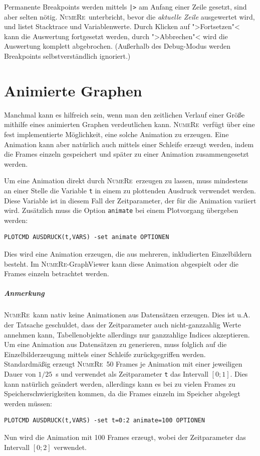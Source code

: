 \documentclass[DIV=14,headsepline,footsepline]{scrbook}
\newcommand{\NR}{\textsc{Nu\-me\-Re}}
\begin{document}
				Permanente Breakpoints werden mittels \verb+|>+ am Anfang einer Zeile gesetzt, sind aber selten nötig. \NR\ unterbricht, bevor die \emph{aktuelle Zeile} ausgewertet wird, und listet Stacktrace und Variablenwerte. Durch Klicken auf ">Fortsetzen"< kann die Auswertung fortgesetzt werden, durch ">Abbrechen"< wird die Auswertung komplett abgebrochen. (Außerhalb des Debug-Modus werden Breakpoints selbstverständlich ignoriert.)
				
		\chapter{Animierte Graphen}
			Manchmal kann es hilfreich sein, wenn man den zeitlichen Verlauf einer Größe mithilfe eines animierten Graphen verdeutlichen kann. \NR\ verfügt über eine fest implementierte Möglichkeit, eine solche Animation zu erzeugen. Eine Animation kann aber natürlich auch mittels einer Schleife erzeugt werden, indem die Frames einzeln gespeichert und später zu einer Animation zusammengesetzt werden.
			
			Um eine Animation direkt durch \NR\ erzeugen zu lassen, muss mindestens an einer Stelle die Variable \verb+t+ in einem zu plottenden Ausdruck verwendet werden. Diese Variable ist in diesem Fall der Zeitparameter, der für die Animation variiert wird. Zusätzlich muss die Option \verb+animate+ bei einem Plotvorgang übergeben werden:
			\begin{lstlisting}
PLOTCMD AUSDRUCK(t,VARS) -set animate OPTIONEN
			\end{lstlisting}
			Dies wird eine Animation erzeugen, die aus mehreren, inkludierten Einzelbildern besteht. Im \NR-GraphViewer kann diese Animation abgespielt oder die Frames einzeln betrachtet werden.
			
			\paragraph{Anmerkung}
				\NR\ kann nativ keine Animationen aus Datensätzen erzeugen. Dies ist u.A. der Tatsache geschuldet, dass der Zeitparameter auch nicht-ganzzahlig Werte annehmen kann, Tabellenobjekte allerdings nur ganzzahlige Indices akzeptieren. Um eine Animation aus Datensätzen zu generieren, muss folglich auf die Einzelbilderzeugung mittels einer Schleife zurückgegriffen werden.\bigskip\\
			Standardmäßig erzeugt \NR\ 50 Frames je Animation mit einer jeweiligen Dauer von $1/25$~s und verwendet als Zeitparameter \verb+t+ das Intervall $[0;1]$. Dies kann natürlich geändert werden, allerdings kann es bei zu vielen Frames zu Speicherschwierigkeiten kommen, da die Frames einzeln im Speicher abgelegt werden müssen:
			\begin{lstlisting}
PLOTCMD AUSDRUCK(t,VARS) -set t=0:2 animate=100 OPTIONEN
			\end{lstlisting}
			Nun wird die Animation mit 100 Frames erzeugt, wobei der Zeitparameter das Intervall $[0;2]$ verwendet.
\end{document}

